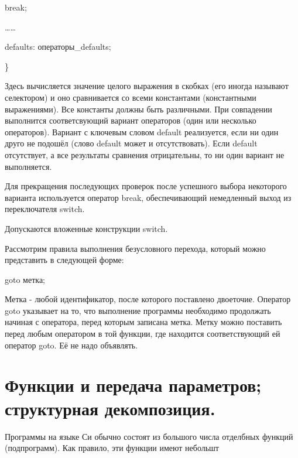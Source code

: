 \documentclass[a4paper, fontsize=10bp]{article} %
\begin{document}
\qquad break;

\dots \qquad \dots \qquad

defaults: операторы\_defaults;

\noindent \}

\noindent Здесь вычисляется значение целого выражения в скобках (его иногда называют селектором) и оно
сравнивается со всеми константами (константными выражениями). Все константы должны быть 
различными. При совпадении выполнится соответсвующий вариант операторов (один или несколько 
операторов). Вариант с ключевым словом default реализуется, если ни один друго не подошёл (слово 
default может и отсутствовать). Если default отсутствует, а все результаты сравнения отрицательны, то ни
один вариант не выполняется.

\noindent Для прекращения последующих проверок после успешного выбора некоторого варианта используется
оператор break, обеспечивающий немедленный выход из переключателя switch.

\noindent Допускаются вложенные конструкции switch.

\noindent Рассмотрим правила выполнения безусловного перехода, который можно представить в следующей форме:

goto метка;

\noindent Метка - любой идентификатор, после которого поставлено двоеточие. Оператор goto указывает на то,
что выполнение программы необходимо продолжать начиная с оператора, перед которым записана метка.
Метку можно поставить перед любым оператором в той функции, где находится соответствующий ей 
оператор goto. Её не надо объявлять.



\section{Функции и передача параметров; структурная декомпозиция.}

\noindent Программы на языке Си обычно состоят из большого числа отделбных функций (подпрограмм). Как правило,
эти функции имеют небольшт
\end{document}
